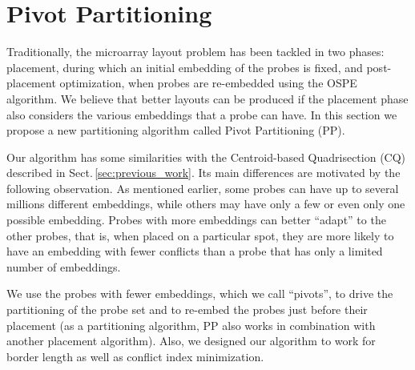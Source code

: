 \documentclass{llncs}
\begin{document}
\section{Pivot Partitioning}
\label{sec:pivotpart}

Traditionally, the microarray layout problem has been tackled in two phases:
placement, during which an initial embedding of the probes is fixed, and
post-placement optimization, when probes are re-embedded using the OSPE
algorithm.  We believe that better layouts can be produced if the placement
phase also considers the various embeddings that a probe can have. In this
section we propose a new partitioning algorithm called Pivot Partitioning
(PP).

Our algorithm has some similarities with the Centroid-based Quadrisection (CQ)
described in Sect.\,\ref{sec:previous_work}.  Its main differences are
motivated by the following observation.  As mentioned earlier, some probes can
have up to several millions different embeddings, while others may have only a
few or even only one possible embedding.  Probes with more embeddings can
better ``adapt'' to the other probes, that is, when placed on a particular
spot, they are more likely to have an embedding with fewer conflicts than a
probe that has only a limited number of embeddings.

We use the probes with fewer embeddings, which we call ``pivots'', to drive
the partitioning of the probe set and to re-embed the probes just before their
placement (as a partitioning algorithm, PP also works in combination with
another placement algorithm). Also, we designed our algorithm to work for
border length as well as conflict index minimization.
\end{document}
